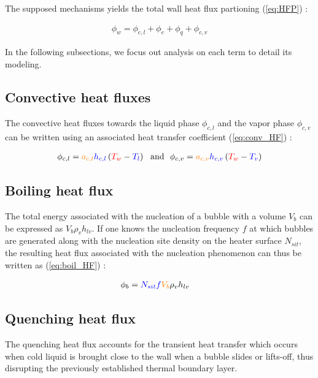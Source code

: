 The supposed mechanisms yields the total wall heat flux partioning (\ref{eq:HFP}) :

\begin{align}
\label{eq:HFP}
\phi_{w}=\phi_{c,l} + \phi_{e} + \phi_{q} + \phi_{c,v}
\end{align}


In the following subsections, we focus out analysis on each term to detail its modeling.

\npar


\subsection{Convective heat fluxes}
\label{subsec:conv_HF}

The convective heat fluxes towards the liquid phase $\phi_{c,l}$ and the vapor phase $\phi_{c,v}$ can be written using an associated heat transfer coefficient (\ref{eq:conv_HF}) :

\begin{align}
\label{eq:conv_HF}
\phi_{c,l}=\orangemath{a_{c,l}} \bluemath{h_{c,l}}\parth{\redmath{T_{w}}-\bluemath{T_{l}}} ~\text{ and }~
\phi_{c,v}=\orangemath{a_{c,v}} \bluemath{ h_{c,v}}\parth{\redmath{T_{w}}-\bluemath{T_{v}}}
\end{align}



\subsection{Boiling heat flux}

The total energy associated with the nucleation of a bubble with a volume $V_{b}$ can be expressed as $V_{b}\rho_{v}h_{lv}$. If one knows the nucleation frequency $f$ at which bubbles are generated along with the nucleation site density on the heater surface $N_{sit}$, the resulting heat flux associated with the nucleation phenomenon can thus be written as (\ref{eq:boil_HF}) :

\begin{align}
\label{eq:boil_HF}
\phi_{b}&=\bluemath{N_{sit}} \bluemath{f} \orangemath{V_{b}} \rho_{v} h_{lv}
\end{align}

\subsection{Quenching heat flux}

The quenching heat flux accounts for the transient heat transfer which occurs when cold liquid is brought close to the wall when a bubble slides or lifts-off, thus disrupting the previously established thermal boundary layer.

